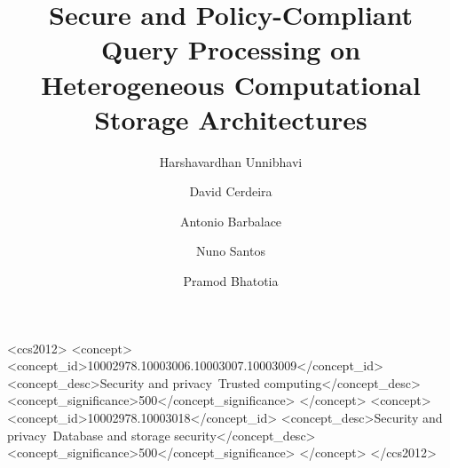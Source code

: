 \documentclass[sigconf]{acmart}
\begin{document}
\fancyhead{}


\title{Secure and Policy-Compliant Query Processing on Heterogeneous Computational Storage Architectures}



\begin{CCSXML}
<ccs2012>
   <concept>
       <concept_id>10002978.10003006.10003007.10003009</concept_id>
       <concept_desc>Security and privacy~Trusted computing</concept_desc>
       <concept_significance>500</concept_significance>
       </concept>
   <concept>
       <concept_id>10002978.10003018</concept_id>
       <concept_desc>Security and privacy~Database and storage security</concept_desc>
       <concept_significance>500</concept_significance>
       </concept>
 </ccs2012>
\end{CCSXML}




\author{Harshavardhan Unnibhavi}
\author{David Cerdeira}
\author{Antonio Barbalace}
\author{Nuno Santos}
\author{Pramod Bhatotia}

\date{}


\maketitle











%


\balance



\end{document}
